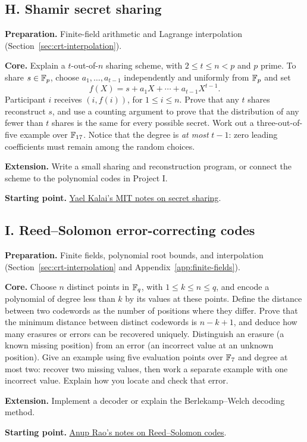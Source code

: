 \begin{capstoneproject}
\subsection*{H. Shamir secret sharing}
\textbf{Preparation.} Finite-field arithmetic and Lagrange interpolation
(Section~\ref{sec:crt-interpolation}).

\textbf{Core.} Explain a $t$-out-of-$n$ sharing scheme, with
$2\le t\le n<p$ and $p$ prime. To share $s\in\mathbb F_p$, choose
$a_1,\ldots,a_{t-1}$ independently and uniformly from $\mathbb F_p$ and set
\[
  f(X)=s+a_1X+\cdots+a_{t-1}X^{t-1}.
\]
Participant $i$ receives $(i,f(i))$, for $1\le i\le n$.
Prove that any $t$ shares reconstruct $s$, and use a counting argument
to prove that the distribution of any fewer than $t$ shares is the same
for every possible secret. Work out a three-out-of-five example over
$\mathbb F_{17}$. Notice that the degree is \emph{at most} $t-1$: zero leading
coefficients must remain among the random choices.

\textbf{Extension.} Write a small sharing and reconstruction program,
or connect the scheme to the polynomial codes in Project I.

\textbf{Starting point.}
\href{https://65610.csail.mit.edu/2025/lec/l11-ss.pdf}{Yael Kalai's MIT
notes on secret sharing}.

\end{capstoneproject}

\begin{capstoneproject}
\subsection*{I. Reed--Solomon error-correcting codes}
\textbf{Preparation.} Finite fields, polynomial root bounds, and
interpolation (Section~\ref{sec:crt-interpolation} and
Appendix~\ref{app:finite-fields}).

\textbf{Core.} Choose $n$ distinct points in $\mathbb F_q$, with
$1\le k\le n\le q$, and encode a polynomial of degree less than $k$
by its values at these points. Define the distance between two codewords
as the number of positions where they differ. Prove that the minimum
distance between distinct codewords is $n-k+1$, and deduce how many
erasures or errors can be recovered uniquely. Distinguish an erasure
(a known missing position) from an error (an incorrect value at an
unknown position). Give an example using five evaluation points over
$\mathbb F_7$ and degree at most two: recover two missing values, then work a
separate example with one incorrect value. Explain how you locate and
check that error.

\textbf{Extension.} Implement a decoder or explain the
Berlekamp--Welch decoding method.

\textbf{Starting point.}
\href{https://homes.cs.washington.edu/~anuprao/pubs/codingtheory/lecture4.pdf}{Anup Rao's notes on Reed--Solomon codes}.

\end{capstoneproject}

